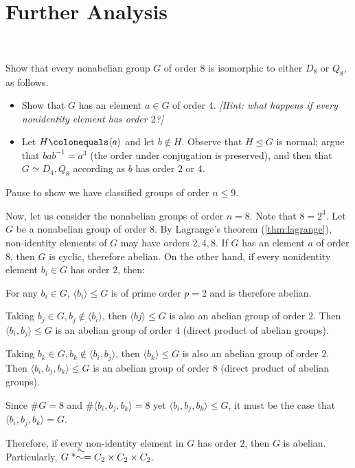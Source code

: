 \newpage
\section{Further Analysis}~\label{sec:analysis}

\begin{Answer}
  \begin{enumalph}
    \item Show that every nonabelian group $G$ of order $8$ is isomorphic to either 
    $D_8$ or $Q_8$, as follows.
    \begin{itemize}
    \item Show that $G$ has an element $a \in G$ of order $4$.  \emph{[Hint: what 
    happens if every nonidentity element has order $2$?]}
    \item Let $H \colonequals \langle a \rangle$ and let $b \not \in H$.  Observe that 
    $H \trianglelefteq G$ is normal; argue that $bab^{-1}=a^3$ (the order under 
    conjugation is preserved), and then that $G \simeq D_4,Q_8$ according as $b$ has 
    order $2$ or $4$.  
    \end{itemize}
    \item Pause to show we have classified groups of order $n \leq 9$.
  \end{enumalph}
\end{Answer}

Now, let us consider the nonabelian groups of order $n = 8$.
Note that $8 = 2^3$.
Let $G$ be a nonabelian group of order $8$.
By Lagrange's theorem (\ref{thm:lagrange}),
non-identity elements of $G$ may have orders $2, 4, 8$.
If $G$ has an element $a$ of order $8$, then $G$ is cyclic, therefore abelian.
On the other hand, if every nonidentity element $b_i \in G$ has order $2$, then:
\begin{enumalph}
  \item For any $b_i \in G$, $\langle b_i \rangle \le G$ is of prime order $p = 2$
    and is therefore abelian.
  \item Taking $b_j \in G, b_j \notin \langle b_i \rangle$,
    then $\langle bj \rangle \le G$ is also an abelian group of order $2$.
    Then $\langle b_i, b_j \rangle \le G$ is an abelian group of order $4$
    (direct product of abelian groups).
  \item Taking $b_k \in G, b_k \notin \langle b_i, b_j \rangle$,
    then $\langle b_k \rangle \le G$ is also an abelian group of order $2$.
    Then $\langle b_i, b_j, b_k \rangle \le G$ is an abelian group of order $8$
    (direct product of abelian groups).
  \item Since $\#G = 8$ and $\#\langle b_i, b_j, b_k \rangle = 8$
    yet $\langle b_i, b_j, b_k \rangle \le G$, it must be the case
    that $\langle b_i, b_j, b_k \rangle = G$.
  \item Therefore, if every non-identity element in $G$ has order $2$, then $G$ is abelian.
    Particularly, $G \isom C_2 \times C_2 \times C_2$.
\end{enumalph}

